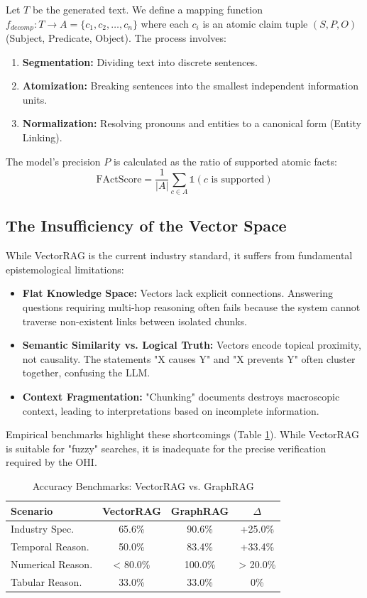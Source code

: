 \documentclass[10pt, a4paper, twocolumn]{article}
\begin{document}
Let $T$ be the generated text. We define a mapping function $f_{decomp}: T \rightarrow A = \{c_1, c_2, \dots, c_n\}$ where each $c_i$ is an atomic claim tuple $(S, P, O)$ (Subject, Predicate, Object). The process involves:
\begin{enumerate}
    \item \textbf{Segmentation:} Dividing text into discrete sentences.
    \item \textbf{Atomization:} Breaking sentences into the smallest independent information units.
    \item \textbf{Normalization:} Resolving pronouns and entities to a canonical form (Entity Linking).
\end{enumerate}

The model's precision $P$ is calculated as the ratio of supported atomic facts:
\begin{equation}
    \text{FActScore} = \frac{1}{|A|} \sum_{c \in A} \mathbb{1}(c \text{ is supported})
\end{equation}

\subsection{The Insufficiency of the Vector Space}
While VectorRAG is the current industry standard, it suffers from fundamental epistemological limitations:
\begin{itemize}
    \item \textbf{Flat Knowledge Space:} Vectors lack explicit connections. Answering questions requiring multi-hop reasoning often fails because the system cannot traverse non-existent links between isolated chunks.
    \item \textbf{Semantic Similarity vs. Logical Truth:} Vectors encode topical proximity, not causality. The statements "X causes Y" and "X prevents Y" often cluster together, confusing the LLM.
    \item \textbf{Context Fragmentation:} "Chunking" documents destroys macroscopic context, leading to interpretations based on incomplete information.
\end{itemize}

Empirical benchmarks highlight these shortcomings (Table \ref{tab:benchmarks}). While VectorRAG is suitable for "fuzzy" searches, it is inadequate for the precise verification required by the OHI.

\begin{table}[h]
\centering
\caption{Accuracy Benchmarks: VectorRAG vs. GraphRAG \cite{lettria2024}}
\label{tab:benchmarks}
\begin{tabular}{@{}lccc@{}}
\toprule
\textbf{Scenario} & \textbf{VectorRAG} & \textbf{GraphRAG} & \textbf{$\Delta$} \\ \midrule
Industry Spec. & 65.6\% & 90.6\% & +25.0\% \\
Temporal Reason. & 50.0\% & 83.4\% & +33.4\% \\
Numerical Reason. & < 80.0\% & 100.0\% & > 20.0\% \\
Tabular Reason. & 33.0\% & 33.0\% & 0\% \\ \bottomrule
\end{tabular}
\end{table}
\end{document}
